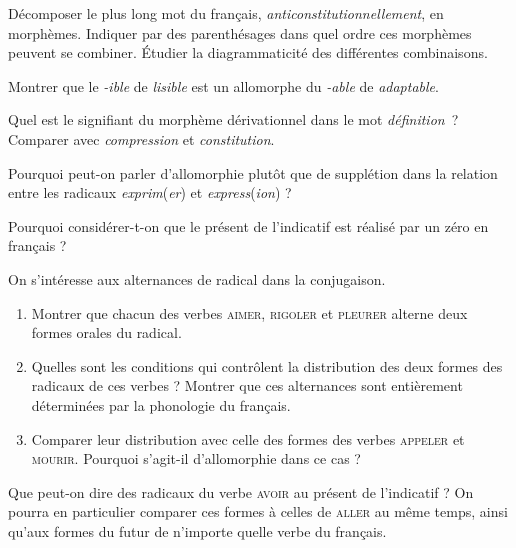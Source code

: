 {     Décomposer le plus long mot du français, \textit{anticonstitutionnellement}, en morphèmes. Indiquer par des parenthésages dans quel ordre ces morphèmes peuvent se combiner. Étudier la diagrammaticité des différentes combinaisons.

     Montrer que le \textit{{}-ible} de \textit{lisible} est un allomorphe du \textit{{}-able} de \textit{adaptable}.

     Quel est le signifiant du morphème dérivationnel dans le mot \textit{définition~}? Comparer avec \textit{compression} et \textit{constitution}.

     Pourquoi peut-on parler d’allomorphie plutôt que de supplétion dans la relation entre les radicaux \textit{exprim}(\textit{er}) et \textit{express}(\textit{ion}) ?

     Pourquoi considérer-t-on que le présent de l’indicatif est réalisé par un zéro en français ?

     On s’intéresse aux alternances de radical dans la conjugaison.
    
    \begin{enumerate}[label=\alph*.]
    \item Montrer que chacun des verbes \textsc{aimer}, \textsc{rigoler} et \textsc{pleurer} alterne deux formes orales du radical.
    \item Quelles sont les conditions qui contrôlent la distribution des deux formes des radicaux de ces verbes ? Montrer que ces alternances sont entièrement déterminées par la phonologie du français.
    \item Comparer leur distribution avec celle des formes des verbes \textsc{appeler} et \textsc{mourir}. Pourquoi s’agit-il d’allomorphie dans ce cas ?
    \end{enumerate}
    
      Que peut-on dire des radicaux du verbe \textsc{avoir} au présent de l'indicatif ? On pourra en particulier comparer ces formes à celles de \textsc{aller} au même temps, ainsi qu'aux formes du futur de n'importe quelle verbe du français.
}
